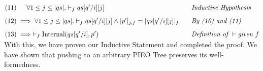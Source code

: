 \documentclass{article}
\begin{document}
\begin{alignat*}{5}
&(11)  \indent \forall 1 \leq j \leq |qs|. \vdash_f qs[q'/i][j] && \hspace{0.3cm} \textit{Inductive Hypothesis}\\[5pt]
&(12) \implies \forall 1 \leq j \leq |qs|. \vdash_f qs[q'/i][j] \land |p'|_{j, f} = |qs[q'/i][j]|_f&&\hspace{0.3cm} \textit{By (10) and (11)}\\[5pt]
&(13) \implies \vdash_f \text{Internal}(qs[q'/i], p') && \hspace{0.3cm} \textit{Definition of } \vdash \textit{given } f\\[-10pt]
\end{alignat*}

With this, we have proven our Inductive Statement and completed the proof. We have shown that pushing to an arbitrary PIEO Tree preserves its well-formedness.\\[-10pt]
\end{document}
